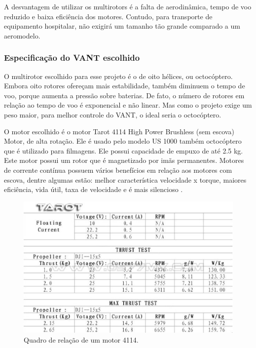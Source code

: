 A desvantagem de utilizar os multirotors é a falta de aerodinâmica, tempo de voo reduzido e baixa eficiência dos motores. Contudo, para transporte de equipamento hospitalar, não exigirá um tamanho tão grande comparado a um aeromodelo.

\subsubsection{Especificação do VANT escolhido}

O multirotor escolhido para esse projeto é o de oito hélices, ou octocóptero. Embora oito rotores ofereçam mais estabilidade, também diminuem o tempo de voo, porque aumenta a pressão sobre baterias. De fato, o número de rotores em relação ao tempo de voo é exponencial e não linear. Mas como o projeto exige um peso maior, para melhor controle do VANT, o ideal seria o octocóptero. 

O motor escolhido é o motor Tarot 4114 High Power Brushless (sem escova) Motor, de alta rotação. Ele é usado pelo modelo US 1000 também octocóptero que é utilizado para filmagens. Ele possui capacidade de empuxo de até 2.5 kg. Este motor possui um rotor que é magnetizado por imãs permanentes. Motores de corrente contínua possuem vários benefícios em relação aos motores com escova, dentre algumas estão: melhor característica velocidade x torque, maiores eficiência, vida útil, taxa de velocidade e é mais silencioso \cite{nascimento}.

\begin{figure}[h!]
    \centering
      \includegraphics[keepaspectratio=true,scale=0.5]{figuras/tarot.eps}
    \caption{Quadro de relação de um motor 4114.}
    \label{fig:tarot}
\end{figure}

